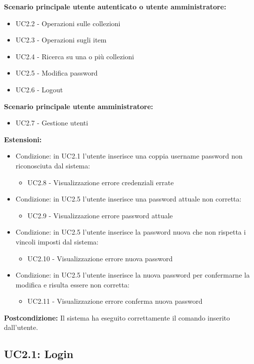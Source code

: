 \documentclass{scalatekids-article}
\begin{document}
\textbf{Scenario principale utente autenticato o utente amministratore:} 
\begin{itemize}
  \item UC2.2 - Operazioni sulle collezioni
  \item UC2.3 - Operazioni sugli item
  \item UC2.4 - Ricerca su una o più collezioni
  \item UC2.5 - Modifica password
  \item UC2.6 - Logout
\end{itemize}
\textbf{Scenario principale utente amministratore:} 
\begin{itemize}
  \item UC2.7 - Gestione utenti
\end{itemize}
\textbf{Estensioni:}
\begin{itemize}
  \item Condizione: in UC2.1 l'utente inserisce una coppia username password non riconosciuta dal sistema:
  \begin{itemize}
    \item UC2.8 - Visualizzazione errore credenziali errate
  \end{itemize}
  \item Condizione: in UC2.5 l'utente inserisce una password attuale non corretta:
  \begin{itemize}
    \item UC2.9 - Visualizzazione errore password attuale
  \end{itemize}
  \item Condizione: in UC2.5 l'utente inserisce la password nuova che non rispetta i vincoli imposti dal sistema: %
  \begin{itemize}
    \item UC2.10 - Visualizzazione errore nuova password
  \end{itemize}
  \item Condizione: in UC2.5 l'utente inserisce la nuova password per confermarne la modifica e risulta essere non corretta: %
  \begin{itemize}
    \item UC2.11 - Visualizzazione errore conferma nuova password
  \end{itemize}
\end{itemize}
\textbf{Postcondizione:} Il sistema ha eseguito correttamente il comando inserito dall'utente.

\subsection{UC2.1: Login}
\end{document}
